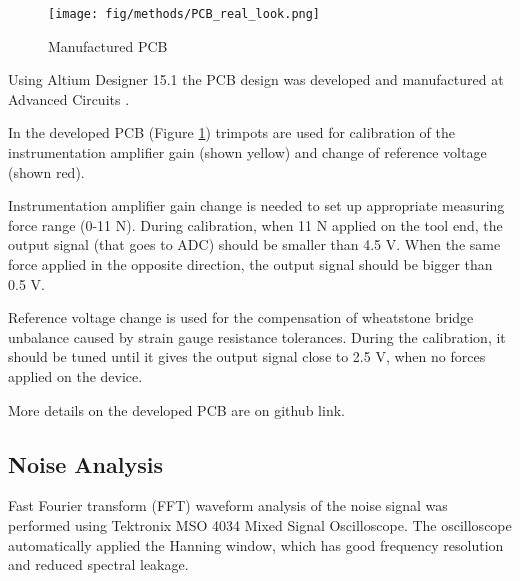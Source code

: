 \begin{figure}[h]
	\begin{center}
		\texttt{[image: fig/methods/PCB\_real\_look.png]}
	\end{center}
	\vspace{-4mm}
	\caption[Manufactured PCB]
	{Manufactured PCB}
	\label{fig:PCB_real}
	\vspace{-2mm}
\end{figure}
	
Using Altium Designer 15.1 the PCB design was developed and manufactured at Advanced Circuits \cite{PCB_manufacturer}. 

In the developed PCB (Figure \ref{fig:PCB_real}) trimpots are used for calibration of the instrumentation amplifier gain (shown yellow) and change of reference voltage (shown red).

Instrumentation amplifier gain change is needed to set up appropriate measuring force range (0-11 N). During calibration, when 11 N applied on the tool end, the output signal (that goes to ADC) should be smaller than 4.5 V. When the same force applied in the opposite direction, the output signal should be bigger than 0.5 V.
 
Reference voltage change is used for the compensation of wheatstone bridge unbalance caused by strain gauge resistance tolerances. During the calibration, it should be tuned until it gives the output signal close to 2.5 V, when no forces applied on the device.

More details on the developed PCB are on github link.

	\subsection{Noise Analysis}
	\label{sec:NoiseExp}
	Fast Fourier transform (FFT) waveform analysis of the noise signal was performed using Tektronix MSO 4034 Mixed Signal Oscilloscope. The oscilloscope automatically applied the Hanning window, which has good frequency resolution and reduced spectral leakage\cite{harris_use_1978}.
	
